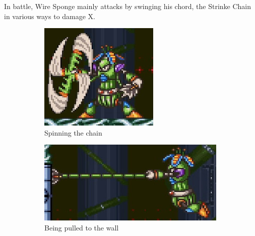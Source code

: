 In battle, Wire Sponge mainly attacks by swinging his chord, the Strinke Chain in various ways to damage X.
\begin{figure}[htp]
	\centering	
	\begin{minipage}{0.4\linewidth}		
		\begin{subfigure}{\linewidth}
			\centering
			\includegraphics[width=\linewidth]{figures/X2/Wire_sponge/Sponge_spin.png}
			\caption{Spinning the chain}
		\end{subfigure}
		\begin{subfigure}{\linewidth}
			\centering
			\includegraphics[width=\linewidth]{figures/X2/Wire_sponge/Sponge_pull.jpg}
			\caption{Being pulled to the wall}
		\end{subfigure}
	\end{minipage}
	\begin{minipage}{0.4\linewidth}		
		\begin{subfigure}{\linewidth}

\end{subfigure}
\end{minipage}
\end{figure}
